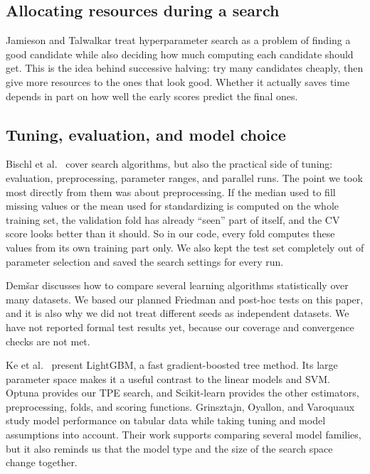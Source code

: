 \documentclass[12pt,letterpaper]{article}
\begin{document}
\subsection{Allocating resources during a search}\label{allocating-resources-during-a-search}

Jamieson and Talwalkar \cite{jamieson16} treat hyperparameter search as a problem of finding a good candidate while also deciding how much computing each candidate should get. This is the idea behind successive halving: try many candidates cheaply, then give more resources to the ones that look good. Whether it actually saves time depends in part on how well the early scores predict the final ones.

\subsection{Tuning, evaluation, and model choice}\label{tuning-evaluation-and-model-choice}

Bischl et al.~\cite{bischl21} cover search algorithms, but also the practical side of tuning: evaluation, preprocessing, parameter ranges, and parallel runs. The point we took most directly from them was about preprocessing. If the median used to fill missing values or the mean used for standardizing is computed on the whole training set, the validation fold has already ``seen'' part of itself, and the CV score looks better than it should. So in our code, every fold computes these values from its own training part only. We also kept the test set completely out of parameter selection and saved the search settings for every run.

Demšar \cite{demsar06} discusses how to compare several learning algorithms statistically over many datasets. We based our planned Friedman and post-hoc tests on this paper, and it is also why we did not treat different seeds as independent datasets. We have not reported formal test results yet, because our coverage and convergence checks are not met.

Ke et al.~\cite{ke17} present LightGBM, a fast gradient-boosted tree method. Its large parameter space makes it a useful contrast to the linear models and SVM. Optuna \cite{akiba19} provides our TPE search, and Scikit-learn \cite{pedregosa11} provides the other estimators, preprocessing, folds, and scoring functions. Grinsztajn, Oyallon, and Varoquaux \cite{grinsztajn22} study model performance on tabular data while taking tuning and model assumptions into account. Their work supports comparing several model families, but it also reminds us that the model type and the size of the search space change together.
\end{document}
